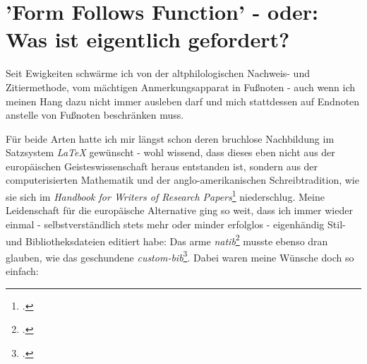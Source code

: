 %
%
%
%
\section{'Form Follows Function' - oder: Was ist eigentlich gefordert?}

Seit Ewigkeiten schwärme ich von der altphilologischen Nachweis- und
Zitiermethode, vom mächtigen Anmerkungsapparat in Fußnoten - auch wenn ich
meinen Hang dazu nicht immer ausleben darf und mich stattdessen auf Endnoten
anstelle von Fußnoten beschränken muss.

Für beide Arten hatte ich mir längst schon deren bruchlose Nachbildung im
Satzsystem \emph{LaTeX} gewünscht - wohl wissend, dass dieses eben nicht aus der
europäischen Geisteswissenschaft heraus entstanden ist, sondern aus der
computerisierten Mathematik und der anglo-amerikanischen Schreibtradition, wie
sie sich im \textit{Handbook for Writers of Research
Papers}\footcite[vgl.][]{ModLanAss2009a} niederschlug. Meine Leidenschaft für
die europäische Alternative ging so weit, dass ich immer wieder einmal -
selbstverständlich stets mehr oder minder erfolglos - eigenhändig Stil- und
Bibliotheksdateien editiert habe: Das arme
\emph{natib}\footcite[vgl.][]{Daly2000a} musste ebenso dran glauben, wie das
geschundene \emph{custom-bib}\footcite[vgl.][]{Daly2007a}. Dabei waren meine
Wünsche doch so einfach:

